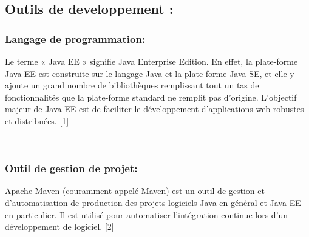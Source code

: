 \documentclass{article}
\begin{document}
{\subsection{Outils de developpement :}
\subsubsection{Langage de programmation: }
\begin{minipage}{0.15\textwidth}
	\begin{minipage}{\linewidth}
	\end{minipage}
\end{minipage}
\hfill
\begin{minipage}{0.75\textwidth}
\vspace{0.5cm}
	Le terme « Java EE » signifie Java Enterprise Edition. En effet, la plate-forme Java EE est construite sur le langage Java et la plate-forme Java SE, et elle y ajoute un grand nombre de bibliothèques remplissant tout un tas de fonctionnalités que la plate-forme standard ne remplit pas d'origine. L'objectif majeur de Java EE est de faciliter le développement d'applications web robustes et distribuées. [1]\\
\end{minipage}\\

\subsubsection{Outil de gestion de projet: }
\begin{minipage}{0.15\textwidth}
	\begin{minipage}{\linewidth}
	\end{minipage}
\end{minipage}
\hfill
\begin{minipage}{0.75\textwidth}
\vspace{0.5cm}
	Apache Maven (couramment appelé Maven) est un outil de gestion et d'automatisation de production des projets logiciels Java en général et Java EE en particulier. Il est utilisé pour automatiser l'intégration continue lors d'un développement de logiciel. [2]\\
\end{minipage}\\


}
\end{document}
